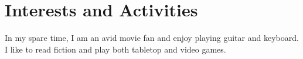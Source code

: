 \section{Interests and Activities}
In my spare time, I am an avid movie fan and enjoy playing guitar and keyboard. I like to read fiction and play both tabletop and video games.